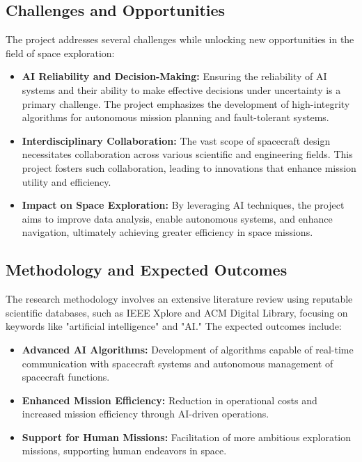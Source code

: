 \documentclass[a4paper, 11pt]{article}
\begin{document}
\subsection{Challenges and Opportunities}

The project addresses several challenges while unlocking new opportunities in the field of space exploration:

\begin{itemize}
    \item \textbf{AI Reliability and Decision-Making:} Ensuring the reliability of AI systems and their ability to make effective decisions under uncertainty is a primary challenge. The project emphasizes the development of high-integrity algorithms for autonomous mission planning and fault-tolerant systems.
    \item \textbf{Interdisciplinary Collaboration:} The vast scope of spacecraft design necessitates collaboration across various scientific and engineering fields. This project fosters such collaboration, leading to innovations that enhance mission utility and efficiency.
    \item \textbf{Impact on Space Exploration:} By leveraging AI techniques, the project aims to improve data analysis, enable autonomous systems, and enhance navigation, ultimately achieving greater efficiency in space missions.
\end{itemize}

\subsection{Methodology and Expected Outcomes}

The research methodology involves an extensive literature review using reputable scientific databases, such as IEEE Xplore and ACM Digital Library, focusing on keywords like "artificial intelligence" and "AI." The expected outcomes include:

\begin{itemize}
    \item \textbf{Advanced AI Algorithms:} Development of algorithms capable of real-time communication with spacecraft systems and autonomous management of spacecraft functions.
    \item \textbf{Enhanced Mission Efficiency:} Reduction in operational costs and increased mission efficiency through AI-driven operations.
    \item \textbf{Support for Human Missions:} Facilitation of more ambitious exploration missions, supporting human endeavors in space.
\end{itemize}
\end{document}
